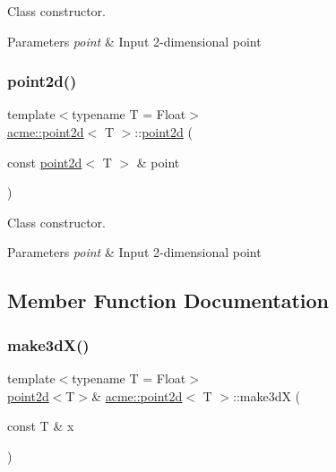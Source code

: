 Class constructor. 


\begin{DoxyParams}{Parameters}
{\em point} & Input 2-\/dimensional point \\
\hline
\end{DoxyParams}
\mbox{\label{classacme_1_1point2d_aa13d8e0048a9936b017fe8e0f4f5cdf4}} 
\subsubsection{\texorpdfstring{point2d()}{point2d()}\hspace{0.1cm}{\footnotesize\ttfamily [3/3]}}
{\footnotesize\ttfamily template$<$typename T = Float$>$ \\
\hyperlink{classacme_1_1point2d}{acme\+::point2d}$<$ T $>$\+::\hyperlink{classacme_1_1point2d}{point2d} (\begin{DoxyParamCaption}\item[{const \hyperlink{classacme_1_1point2d}{point2d}$<$ T $>$ \&}]{point }\end{DoxyParamCaption})\hspace{0.3cm}{\ttfamily [inline]}}



Class constructor. 


\begin{DoxyParams}{Parameters}
{\em point} & Input 2-\/dimensional point \\
\hline
\end{DoxyParams}


\subsection{Member Function Documentation}
\mbox{\label{classacme_1_1point2d_a23948fcd0635557e8eeb0c298bb96f68}} 
\subsubsection{\texorpdfstring{make3d\+X()}{make3dX()}}
{\footnotesize\ttfamily template$<$typename T = Float$>$ \\
\hyperlink{classacme_1_1point2d}{point2d}$<$T$>$\& \hyperlink{classacme_1_1point2d}{acme\+::point2d}$<$ T $>$\+::make3dX (\begin{DoxyParamCaption}\item[{const T \&}]{x }\end{DoxyParamCaption})\hspace{0.3cm}{\ttfamily [inline]}}



